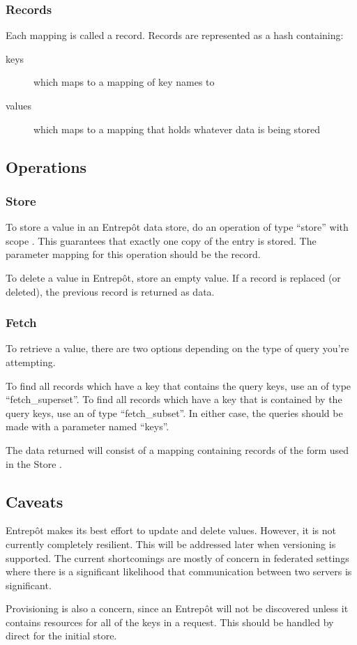 \subsubsection{Records}

Each mapping is called a record.  Records are represented as a hash containing:

\begin{description} 
	\item[keys] which maps to a mapping of key names to \resources{}
	\item[values] which maps to a mapping that holds whatever data is being stored
\end{description}

\subsection{Operations}

\subsubsection{Store}

To store a value in an Entrep\^ot data store, do an operation of type ``store'' with scope \single{}.  This guarantees that exactly one copy of the entry is stored.  The parameter mapping for this operation should be the record.

To delete a value in Entrep\^ot, store an empty value.  If a record is replaced (or deleted), the previous record is returned as data.

\subsubsection{Fetch}

To retrieve a value, there are two options depending on the type of query you're attempting.

To find all records which have a key that contains the query keys, use an \operation{} of type ``fetch\_superset''.  To find all records which have a key that is contained by the query keys, use an \operation{} of type ``fetch\_subset''.  In either case, the queries should be made with a parameter named ``keys''.

The data returned will consist of a mapping containing records of the form used in the Store \operation{}.

\subsection{Caveats}

Entrep\^ot makes its best effort to update and delete values.  However, it is not currently completely resilient.  This will be addressed later when versioning is supported.  The current shortcomings are mostly of concern in federated settings where there is a significant likelihood that communication between two servers is significant.

Provisioning is also a concern, since an Entrep\^ot \agent{} will not be discovered unless it contains resources for all of the keys in a request.  This should be handled by direct \operations{} for the initial store.
